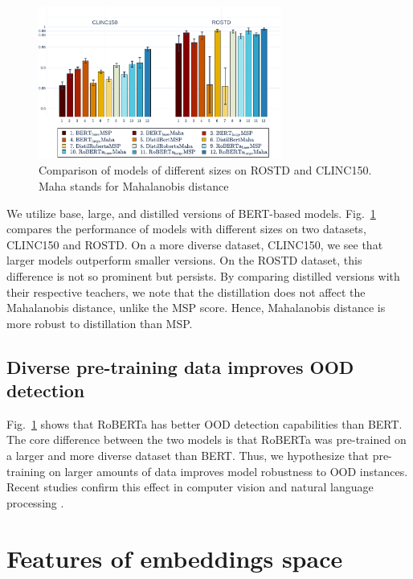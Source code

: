 \documentclass[letterpaper, final]{article} %
\begin{document}
\begin{figure}[ht]%
    \centering
    \includegraphics[width=8cm]{images/aupr_clinc_rostd}
    \caption{Comparison of models of different sizes on ROSTD and CLINC150. Maha stands for Mahalanobis distance}
    \label{fig:model_size_aupr_ood}
\end{figure}


We utilize base, large, and distilled versions of BERT-based models. Fig.~\ref{fig:model_size_aupr_ood} compares the performance of models with different sizes on two datasets, CLINC150 and ROSTD. On a more diverse dataset, CLINC150, we see that larger models outperform smaller versions. On the ROSTD dataset, this difference is not so prominent but persists. By comparing distilled versions with their respective teachers, we note that the distillation does not affect the Mahalanobis distance, unlike the MSP score. Hence, Mahalanobis distance is more robust to distillation than MSP.

\subsection{Diverse pre-training data improves OOD detection}

 Fig.~\ref{fig:model_size_aupr_ood} shows that RoBERTa has better OOD detection capabilities than BERT. The core difference between the two models is that RoBERTa was pre-trained on a larger and more diverse dataset than BERT. Thus, we hypothesize that pre-training on larger amounts of data improves model robustness to OOD instances. Recent studies confirm this effect in computer vision \cite{hendrycks_pretraining19,orhan2019robustness} and natural language processing \cite{Hendrycks2020PretrainedTI}.

\section{Features of embeddings space}
\end{document}
